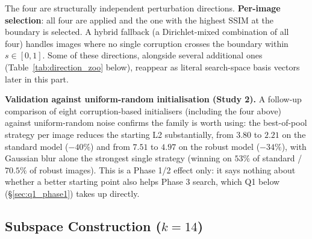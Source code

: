 \documentclass[11pt, a4paper]{article}
\begin{document}
The four are structurally independent perturbation directions. \textbf{Per-image selection}: all four are applied and the one with the highest SSIM at the boundary is selected. A hybrid fallback (a Dirichlet-mixed combination of all four) handles images where no single corruption crosses the boundary within $s\in[0,1]$. Some of these directions, alongside several additional ones (Table~\ref{tab:direction_zoo} below), reappear as literal search-space basis vectors later in this part.

\textbf{Validation against uniform-random initialisation (Study 2).} A follow-up comparison of eight corruption-based initialisers (including the four above) against uniform-random noise confirms the family is worth using: the best-of-pool strategy per image reduces the starting L2 substantially, from $3.80$ to $2.21$ on the standard model ($-40\%$) and from $7.51$ to $4.97$ on the robust model ($-34\%$), with Gaussian blur alone the strongest single strategy (winning on $53\%$ of standard / $70.5\%$ of robust images). This is a Phase 1/2 effect only: it says nothing about whether a better starting point also helps Phase 3 search, which Q1 below (\S\ref{sec:q1_phase1}) takes up directly.

\subsection{Subspace Construction ($k=14$)}
\label{sec:subspace_construction}
\end{document}
